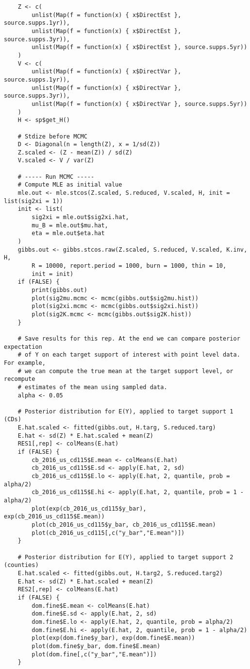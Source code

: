 \documentclass[12pt]{article}
\begin{document}
\begin{scriptsize}
\begin{verbatim}
	Z <- c(
		unlist(Map(f = function(x) { x$DirectEst }, source.supps.1yr)),
		unlist(Map(f = function(x) { x$DirectEst }, source.supps.3yr)),
		unlist(Map(f = function(x) { x$DirectEst }, source.supps.5yr))
	)
	V <- c(
		unlist(Map(f = function(x) { x$DirectVar }, source.supps.1yr)),
		unlist(Map(f = function(x) { x$DirectVar }, source.supps.3yr)),
		unlist(Map(f = function(x) { x$DirectVar }, source.supps.5yr))
	)
	H <- sp$get_H()

	# Stdize before MCMC
	D <- Diagonal(n = length(Z), x = 1/sd(Z))
	Z.scaled <- (Z - mean(Z)) / sd(Z)
	V.scaled <- V / var(Z)

	# ----- Run MCMC -----
	# Compute MLE as initial value
	mle.out <- mle.stcos(Z.scaled, S.reduced, V.scaled, H, init = list(sig2xi = 1))
	init <- list(
		sig2xi = mle.out$sig2xi.hat,
		mu_B = mle.out$mu.hat,
		eta = mle.out$eta.hat
	)
	gibbs.out <- gibbs.stcos.raw(Z.scaled, S.reduced, V.scaled, K.inv, H,
		R = 10000, report.period = 1000, burn = 1000, thin = 10,
		init = init)
	if (FALSE) {
		print(gibbs.out)
		plot(sig2mu.mcmc <- mcmc(gibbs.out$sig2mu.hist))
		plot(sig2xi.mcmc <- mcmc(gibbs.out$sig2xi.hist))
		plot(sig2K.mcmc <- mcmc(gibbs.out$sig2K.hist))
	}

	# Save results for this rep. At the end we can compare posterior expectation
	# of Y on each target support of interest with point level data. For example,
	# we can compute the true mean at the target support level, or recompute
	# estimates of the mean using sampled data.
	alpha <- 0.05

	# Posterior distribution for E(Y), applied to target support 1 (CDs)
	E.hat.scaled <- fitted(gibbs.out, H.targ, S.reduced.targ)
	E.hat <- sd(Z) * E.hat.scaled + mean(Z)
	RES1[,rep] <- colMeans(E.hat)
	if (FALSE) {
		cb_2016_us_cd115$E.mean <- colMeans(E.hat)
		cb_2016_us_cd115$E.sd <- apply(E.hat, 2, sd)
		cb_2016_us_cd115$E.lo <- apply(E.hat, 2, quantile, prob = alpha/2)
		cb_2016_us_cd115$E.hi <- apply(E.hat, 2, quantile, prob = 1 - alpha/2)
		plot(exp(cb_2016_us_cd115$y_bar), exp(cb_2016_us_cd115$E.mean))
		plot(cb_2016_us_cd115$y_bar, cb_2016_us_cd115$E.mean)
		plot(cb_2016_us_cd115[,c("y_bar","E.mean")])
	}
	
	# Posterior distribution for E(Y), applied to target support 2 (counties)
	E.hat.scaled <- fitted(gibbs.out, H.targ2, S.reduced.targ2)
	E.hat <- sd(Z) * E.hat.scaled + mean(Z)
	RES2[,rep] <- colMeans(E.hat)
	if (FALSE) {
		dom.fine$E.mean <- colMeans(E.hat)
		dom.fine$E.sd <- apply(E.hat, 2, sd)
		dom.fine$E.lo <- apply(E.hat, 2, quantile, prob = alpha/2)
		dom.fine$E.hi <- apply(E.hat, 2, quantile, prob = 1 - alpha/2)
		plot(exp(dom.fine$y_bar), exp(dom.fine$E.mean))
		plot(dom.fine$y_bar, dom.fine$E.mean)
		plot(dom.fine[,c("y_bar","E.mean")])
	}


\end{verbatim}
\end{scriptsize}
\end{document}
